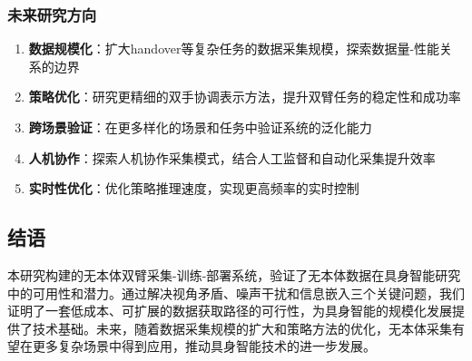 \subsubsection{未来研究方向}

\begin{enumerate}[leftmargin=2em]
    \item \textbf{数据规模化}：扩大handover等复杂任务的数据采集规模，探索数据量-性能关系的边界
    \item \textbf{策略优化}：研究更精细的双手协调表示方法，提升双臂任务的稳定性和成功率
    \item \textbf{跨场景验证}：在更多样化的场景和任务中验证系统的泛化能力
    \item \textbf{人机协作}：探索人机协作采集模式，结合人工监督和自动化采集提升效率
    \item \textbf{实时性优化}：优化策略推理速度，实现更高频率的实时控制
\end{enumerate}

\subsection{结语}

本研究构建的无本体双臂采集-训练-部署系统，验证了无本体数据在具身智能研究中的可用性和潜力。通过解决视角矛盾、噪声干扰和信息嵌入三个关键问题，我们证明了一套低成本、可扩展的数据获取路径的可行性，为具身智能的规模化发展提供了技术基础。未来，随着数据采集规模的扩大和策略方法的优化，无本体采集有望在更多复杂场景中得到应用，推动具身智能技术的进一步发展。

